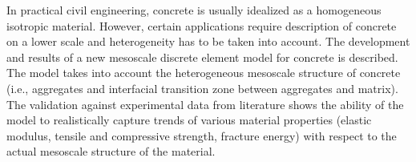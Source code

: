 {%
In practical civil engineering, concrete is usually idealized as a homogeneous isotropic material.
However, certain applications require description of concrete on a lower scale and heterogeneity has to be taken into account.
The development and results of a new mesoscale discrete element model for concrete is described.
The model takes into account the heterogeneous mesoscale structure of concrete (i.e., aggregates and interfacial transition zone between aggregates and matrix).
The validation against experimental data from literature shows the ability of the model to realistically capture trends of various material properties (elastic modulus, tensile and compressive strength, fracture energy) with respect to the actual mesoscale structure of the material.
}



